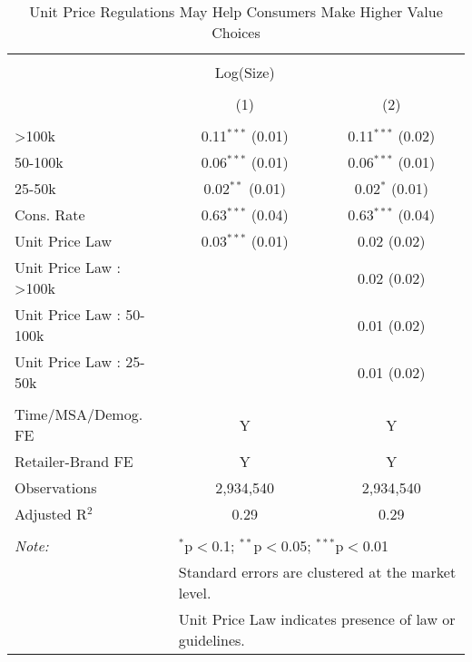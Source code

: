 
\begin{table}[!htbp] \centering 
  \caption{Unit Price Regulations May Help Consumers Make Higher Value Choices} 
  \label{tab:unitPriceLawTp} 
\begin{tabular}{@{\extracolsep{5pt}}lcc} 
\\[-1.8ex]\hline 
\hline \\[-1.8ex] 
 & Log(Size) &  \\ 
\\[-1.8ex] & (1) & (2)\\ 
\hline \\[-1.8ex] 
 >100k & 0.11$^{***}$ (0.01) & 0.11$^{***}$ (0.02) \\ 
  50-100k & 0.06$^{***}$ (0.01) & 0.06$^{***}$ (0.01) \\ 
  25-50k & 0.02$^{**}$ (0.01) & 0.02$^{*}$ (0.01) \\ 
  Cons. Rate & 0.63$^{***}$ (0.04) & 0.63$^{***}$ (0.04) \\ 
  Unit Price Law & 0.03$^{***}$ (0.01) & 0.02 (0.02) \\ 
  Unit Price Law : >100k &  & 0.02 (0.02) \\ 
  Unit Price Law : 50-100k &  & 0.01 (0.02) \\ 
  Unit Price Law : 25-50k &  & 0.01 (0.02) \\ 
 \hline \\[-1.8ex] 
Time/MSA/Demog. FE & Y & Y \\ 
Retailer-Brand FE & Y & Y \\ 
Observations & 2,934,540 & 2,934,540 \\ 
Adjusted R$^{2}$ & 0.29 & 0.29 \\ 
\hline 
\hline \\[-1.8ex] 
\textit{Note:}  & \multicolumn{2}{l}{$^{*}$p$<$0.1; $^{**}$p$<$0.05; $^{***}$p$<$0.01} \\ 
 & \multicolumn{2}{l}{Standard errors are clustered at the market level.} \\ 
 & \multicolumn{2}{l}{Unit Price Law indicates presence of law or guidelines.} \\ 
\end{tabular} 
\end{table} 
